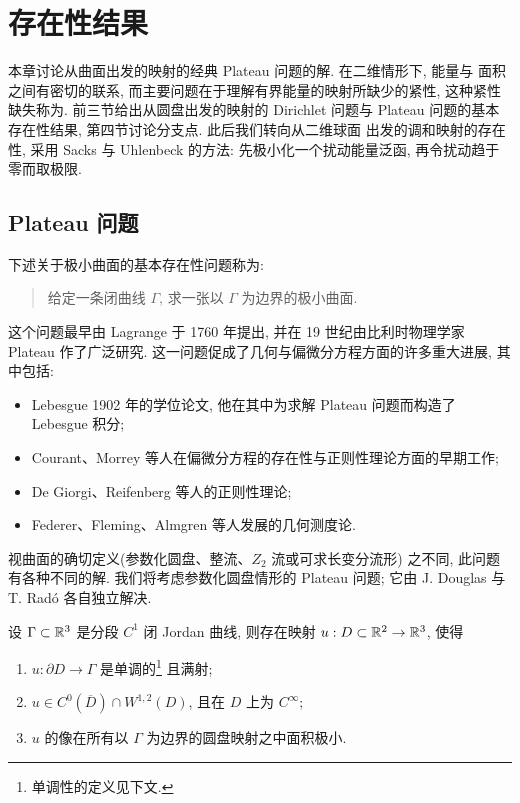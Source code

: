 \chapter{存在性结果}
\label{chap:4}

本章讨论从曲面出发的映射的经典 Plateau 问题的解. 在二维情形下, 能量与
面积之间有密切的联系, 而主要问题在于理解有界能量的映射所缺少的紧性,
这种紧性缺失称为. 前三节给出从圆盘出发的映射的 Dirichlet 问题与
Plateau 问题的基本存在性结果, 第四节讨论分支点. 此后我们转向从二维球面
出发的调和映射的存在性, 采用 Sacks 与 Uhlenbeck \cite{SaUh} 的方法:
先极小化一个扰动能量泛函, 再令扰动趋于零而取极限.

\section{Plateau 问题}
\label{sec:4.1}

下述关于极小曲面的基本存在性问题称为:

\begin{quote}
给定一条闭曲线 $\Gamma$, 求一张以 $\Gamma$ 为边界的极小曲面.
\end{quote}

这个问题最早由 Lagrange 于 1760 年提出, 并在 19 世纪由比利时物理学家
Plateau 作了广泛研究. 这一问题促成了几何与偏微分方程方面的许多重大进展,
其中包括:

\begin{itemize}[leftmargin=1.6em,itemsep=2pt,topsep=2pt]
\item Lebesgue 1902 年的学位论文, 他在其中为求解 Plateau 问题而构造了
      Lebesgue 积分;
\item Courant、Morrey 等人在偏微分方程的存在性与正则性理论方面的早期工作;
\item De Giorgi、Reifenberg 等人的正则性理论;
\item Federer、Fleming、Almgren 等人发展的几何测度论.
\end{itemize}

视曲面的确切定义(参数化圆盘、整流、$Z_2$ 流或可求长变分流形)
之不同, 此问题有各种不同的解. 我们将考虑参数化圆盘情形的 Plateau 问题;
它由 J. Douglas \cite{Do} 与 T. Rad\'o \cite{Ra1} 各自独立解决.

\begin{theorem}
\label{thm:4.1}
设 $\Gamma\subset\mathbb{R}^3$ 是分段 $C^1$ 闭 Jordan 曲线, 则存在映射
$u:D\subset\mathbb{R}^2\to\mathbb{R}^3$, 使得
\begin{enumerate}
\item $u:\partial D\to\Gamma$ 是单调的\footnote{单调性的定义见下文.} 且满射;
\item $u\in C^0(\overline{D})\cap W^{1,2}(D)$, 且在 $D$ 上为 $C^\infty$;
\item $u$ 的像在所有以 $\Gamma$ 为边界的圆盘映射之中面积极小.
\end{enumerate}
\end{theorem}

